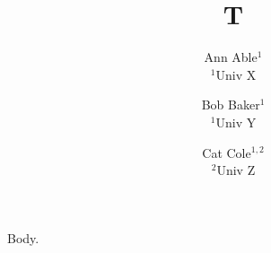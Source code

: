 \documentclass{article}
\begin{document}
\title{T}
\author{Ann Able$^{1}$ \\ $^{1}$Univ X \and Bob Baker$^{1}$ \\ $^{1}$Univ Y \and Cat Cole$^{1,2}$ \\ $^{2}$Univ Z}
\maketitle
Body.
\end{document}
